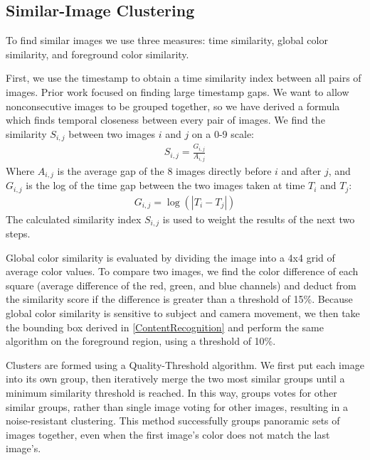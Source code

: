 \documentclass{article}
\begin{document}

\subsection{Similar-Image Clustering}
To find similar images we use three measures: time similarity, global color similarity, and foreground color similarity.


First, we use the timestamp to obtain a time similarity index between all pairs of images. Prior work focused on finding large timestamp gaps\cite{1292402}. We want to allow nonconsecutive images to be grouped together, so we have derived a formula which finds temporal closeness between every pair of images. We find the similarity \(S_{i,j}\) between two images \(i\) and \(j\) on a 0-9 scale:
\begin{eqnarray}
S_{i,j}=\frac{G_{i,j}}{A_{i,j}}
\end{eqnarray}
Where \(A_{i,j}\) is the average gap of the 8 images directly before \(i\) and after \(j\), and  \(G_{i,j}\) is the log of the time gap between the two images taken at time \(T_i\) and \(T_j\):
\begin{eqnarray}
G_{i,j}=\log(|T_i-T_j|)
\end{eqnarray}
The calculated similarity index \(S_{i,j}\) is used to weight the results of the next two steps.

Global color similarity is evaluated by dividing the image into a 4x4 grid of average color values. To compare two images, we find the color difference of each square (average difference of the red, green, and blue channels) and deduct from the similarity score if the difference is greater than a threshold of 15\%. Because global color similarity is sensitive to subject and camera movement, we then take the bounding box derived in \ref{ContentRecognition} and perform the same algorithm on the foreground region, using a threshold of 10\%.

Clusters are formed using a Quality-Threshold algorithm. We first put each image into its own group, then iteratively merge the two most similar groups until a minimum similarity threshold is reached. In this way, groups votes for other similar groups, rather than single image voting for other images, resulting in a noise-resistant clustering. This method successfully groups panoramic sets of images together, even when the first image's color does not match the last image's. %
\end{document}

